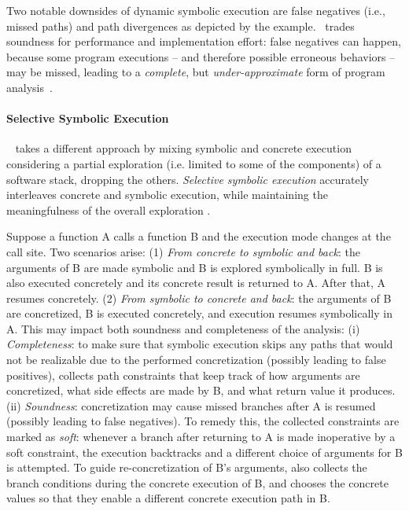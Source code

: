  Two notable downsides of dynamic symbolic execution are false negatives (i.e., missed paths) and path divergences as depicted by the example. \dse\ trades soundness for performance and implementation effort: false negatives can happen, because some program executions -- and therefore possible erroneous behaviors -- may be missed, leading to a {\em complete}, but {\em under-approximate} form of program analysis~\cite{Baldoni:2018:SSE:3212709.3182657}. %

\paragraph{Selective Symbolic Execution}
{\textsc \stwoe}~\cite{CKC-TOCS12} takes a different approach by mixing symbolic and concrete execution considering a partial exploration (i.e. limited to some of the components) of a software stack, dropping the others. {\em Selective symbolic execution} accurately interleaves concrete and symbolic execution, while maintaining the meaningfulness of the overall exploration .

Suppose a function A calls a function B and the execution mode changes at the call site. Two scenarios arise:
(1) {\em From concrete to symbolic and back}: the arguments of B are made symbolic and B is explored symbolically in full. B is also executed concretely and its concrete result is returned to A. After that, A resumes concretely. 
(2) {\em From symbolic to concrete and back}: the arguments of B are concretized, B is executed concretely, and execution resumes symbolically in A. This may impact both soundness and completeness of the analysis: (i) {\em Completeness}: to make sure that symbolic execution skips any paths that would not be realizable due to the performed concretization (possibly leading to false positives), {\textsc \stwoe} collects path constraints that keep track of how arguments are concretized, what side effects are made by B, and what return value it produces. (ii) {\em Soundness}: concretization may cause missed branches after A is resumed (possibly leading to false negatives). To remedy this, the collected constraints are marked as {\em soft}: whenever a branch after returning to A is made inoperative by a soft constraint, the execution backtracks and a different choice of arguments for B is attempted. To guide re-concretization of B's arguments, {\textsc \stwoe} also collects the branch conditions during the concrete execution of B, and chooses the concrete values so that they enable a different concrete execution path in B.


